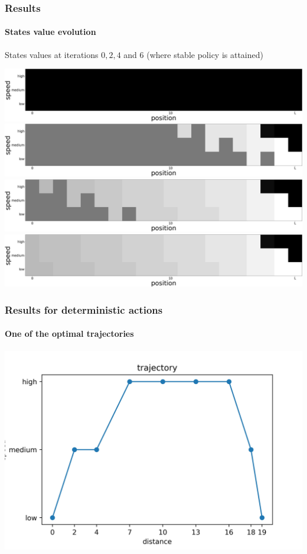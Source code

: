 \documentclass[dvipsnames,svgnames]{beamer}
\begin{document}
\begin{frame}
\frametitle{Results}
\framesubtitle{States value evolution}
\begin{block}{}
\centering
States values at iterations $0,2,4$ and $6$ (where stable policy is attained)
\end{block}
\vspace{1cm}
\centering
\includegraphics[scale=0.1]{img/value0.jpg}\\
\includegraphics[scale=0.1]{img/value2.jpg}\\
\includegraphics[scale=0.1]{img/value4.jpg}\\
\includegraphics[scale=0.1]{img/value6.jpg}\\


\end{frame}


\begin{frame}
\frametitle{Results for deterministic actions}
\framesubtitle{One of the optimal trajectories}
\centering
\includegraphics[scale=0.5]{img/trajectory.jpg}
\end{frame}
\end{document}
